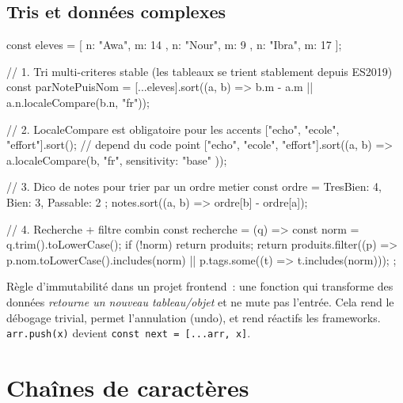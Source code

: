 \documentclass[12pt,a4paper,twoside,openright]{book}
\begin{document}
\subsection{Tris et donn\'ees complexes}

\begin{codejs}
const eleves = [{ n: "Awa", m: 14 }, { n: "Nour", m: 9 }, { n: "Ibra", m: 17 }];

// 1. Tri multi-criteres stable (les tableaux se trient stablement depuis ES2019)
const parNotePuisNom = [...eleves].sort((a, b) => b.m - a.m || a.n.localeCompare(b.n, "fr"));

// 2. LocaleCompare est obligatoire pour les accents
["echo", "ecole", "effort"].sort();                              // depend du code point
["echo", "ecole", "effort"].sort((a, b) => a.localeCompare(b, "fr", { sensitivity: "base" }));

// 3. Dico de notes pour trier par un ordre metier
const ordre = { TresBien: 4, Bien: 3, Passable: 2 };
notes.sort((a, b) => ordre[b] - ordre[a]);

// 4. Recherche + filtre combin
const recherche = (q) => {
  const norm = q.trim().toLowerCase();
  if (!norm) return produits;
  return produits.filter((p) => p.nom.toLowerCase().includes(norm) || p.tags.some((t) => t.includes(norm)));
};
\end{codejs}

\begin{astuce}
R\`egle d'immutabilit\'e dans un projet frontend~: une fonction qui transforme des donn\'ees
\emph{retourne un nouveau tableau/objet} et ne mute pas l'entr\'ee. Cela rend le d\'ebogage trivial,
permet l'annulation (undo), et rend r\'eactifs les frameworks. \verb|arr.push(x)| devient
\verb|const next = [...arr, x]|.
\end{astuce}

\section{Cha\^ines de caract\`eres}
\end{document}

